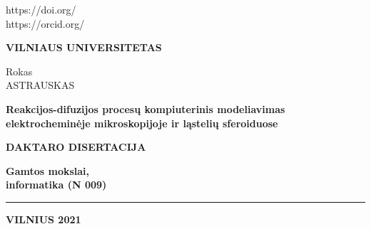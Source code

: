 \newpage
\thispagestyle{empty}                   %
{\selectfont
\begin{flushright}
https://doi.org/ \\
https://orcid.org/ %
\end{flushright}
\begin{center}
	\vspace*{5mm}	
	   \begin{flushleft} 
	\renewcommand\bfdefault{bc} 
	\bf \large
	VILNIAUS UNIVERSITETAS \\
	   \end{flushleft} 	

	
	\vspace{50mm}
	
	\begin{flushleft}
\renewcommand\bfdefault{bc} \bf
	{\Large Rokas\\ ASTRAUSKAS\par}
\end{flushleft}
	\vspace{10mm}
	\begin{flushleft}
	{\huge 
    \renewcommand\bfdefault{bc}
    \bf
    Reakcijos-difuzijos proces\k{u} kompiuterinis modeliavimas elektrochemin\.{e}je mikroskopijoje ir l\k{a}steli\k{u} sferoiduose	
	}
	\end{flushleft}
  \vspace{5mm}
  	\begin{flushleft}
  	{\bf DAKTARO DISERTACIJA}\\%
  	\end{flushleft}
  \vspace{15mm}
    	\begin{flushleft}
\renewcommand\bfdefault{bc} \bf
  Gamtos mokslai,\\
  informatika (N 009)
  	\end{flushleft}
     \begin{flushleft} 
	\noindent\rule{3cm}{0.4pt}
\end{flushleft} 
\begin{flushleft} 
\renewcommand\bfdefault{bc} \bf
	VILNIUS 2021
\end{flushleft} 
\end{center}
}
\newpage
\thispagestyle{empty}                   %

